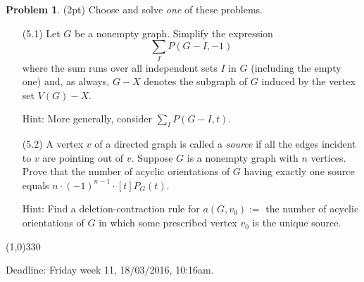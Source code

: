 \documentclass[a4paper]{article}
\theoremstyle{definition}
\newtheorem{myex}{Problem}
\begin{document}
\begin{myex}(2pt)
Choose and solve \emph{one} of these problems.
\begin{itemize}
\item[(5.1)]
Let $G$ be a nonempty graph. Simplify the expression
$$\sum_I P(G-I, -1)$$
where the sum runs over all independent sets $I$ in $G$ (including the empty one) and, as always, $G-X$ denotes the subgraph of $G$ induced by the vertex set $V(G)- X$.

Hint: More generally, consider $\sum_I P(G-I, t)$. 
\item[(5.2)]
A vertex $v$ of a directed graph is called a \emph{source} if all the edges incident to $v$ are pointing out of $v$. Suppose $G$ is a nonempty graph with $n$ vertices. Prove that the number of acyclic orientations of $G$ having exactly one source equals $n\cdot (-1)^{n-1}\cdot [t]P_G(t)$.

Hint: Find a deletion-contraction rule for $a(G,v_0):=$ the number of acyclic orientations of $G$ in which some prescribed vertex $v_0$ is the unique source.
\end{itemize}
\end{myex}

\begin{center}
	\line(1,0){330}
\end{center}

Deadline: Friday week 11, 18/03/2016, 10:16am. 
\end{document}
